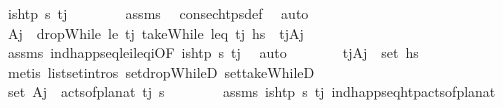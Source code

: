 \begin{isabellebody}
\ {\isachardoublequoteopen}is{\isacharunderscore}{\kern0pt}htp\ {\isasympi}s\ t\isactrlsub j{\isachardoublequoteclose}\isanewline
\ \ \ \ \ \ \isamarkupfalse%
\ assms\ \isamarkupfalse%
\ consec{\isacharunderscore}{\kern0pt}htps{\isacharunderscore}{\kern0pt}def\ \isamarkupfalse%
\ auto\isanewline
\ \ \ \ \isamarkupfalse%
\ A\isactrlsub j\ \ {\isachardoublequoteopen}dropWhile\ {\isacharparenleft}{\kern0pt}le\ t\isactrlsub j{\isacharparenright}{\kern0pt}\ {\isacharparenleft}{\kern0pt}takeWhile\ {\isacharparenleft}{\kern0pt}leq\ t\isactrlsub j{\isacharparenright}{\kern0pt}\ hs{\isacharparenright}{\kern0pt}\ {\isacharequal}{\kern0pt}\ {\isacharbrackleft}{\kern0pt}{\isacharparenleft}{\kern0pt}t\isactrlsub j{\isacharcomma}{\kern0pt}A\isactrlsub j{\isacharparenright}{\kern0pt}{\isacharbrackright}{\kern0pt}{\isachardoublequoteclose}\isanewline
\ \ \ \ \ \ \isamarkupfalse%
\ assms\ ind{\isacharunderscore}{\kern0pt}happ{\isacharunderscore}{\kern0pt}seq{\isacharunderscore}{\kern0pt}le\isactrlsub i{\isacharunderscore}{\kern0pt}leq\isactrlsub i{\isacharbrackleft}{\kern0pt}OF\ {\isacartoucheopen}is{\isacharunderscore}{\kern0pt}htp\ {\isasympi}s\ t\isactrlsub j{\isacartoucheclose}{\isacharbrackright}{\kern0pt}\ \isamarkupfalse%
\ auto\isanewline
\ \ \ \ \isamarkupfalse%
\ \isamarkupfalse%
\ {\isachardoublequoteopen}{\isacharparenleft}{\kern0pt}t\isactrlsub j{\isacharcomma}{\kern0pt}A\isactrlsub j{\isacharparenright}{\kern0pt}\ {\isasymin}\ set\ hs{\isachardoublequoteclose}\isanewline
\ \ \ \ \ \ \isamarkupfalse%
\ {\isacharparenleft}{\kern0pt}metis\ list{\isachardot}{\kern0pt}set{\isacharunderscore}{\kern0pt}intros{\isacharparenleft}{\kern0pt}{}{\isacharparenright}{\kern0pt}\ set{\isacharunderscore}{\kern0pt}dropWhileD\ set{\isacharunderscore}{\kern0pt}takeWhileD{\isacharparenright}{\kern0pt}\isanewline
\ \ \ \ \isamarkupfalse%
\ \isamarkupfalse%
\ {\isachardoublequoteopen}set\ A\isactrlsub j\ {\isacharequal}{\kern0pt}\ acts{\isacharunderscore}{\kern0pt}of{\isacharunderscore}{\kern0pt}plan{\isacharunderscore}{\kern0pt}at\ t\isactrlsub j\ {\isasympi}s{\isachardoublequoteclose}\isanewline
\ \ \ \ \ \ \isamarkupfalse%
\ assms\ {\isacartoucheopen}is{\isacharunderscore}{\kern0pt}htp\ {\isasympi}s\ t\isactrlsub j{\isacartoucheclose}\ ind{\isacharunderscore}{\kern0pt}happ{\isacharunderscore}{\kern0pt}seq{\isacharunderscore}{\kern0pt}htp{\isacharunderscore}{\kern0pt}acts{\isacharunderscore}{\kern0pt}of{\isacharunderscore}{\kern0pt}plan{\isacharunderscore}{\kern0pt}at\ \isamarkupfalse%

\end{isabellebody}
